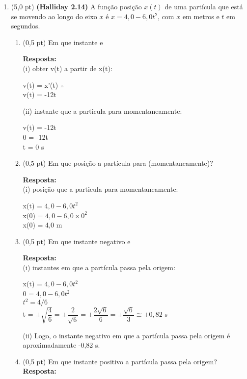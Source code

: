 \documentclass[12pt,a4paper,oneside]{article}
\begin{document}
\begin{enumerate}
	\item (5,0 pt) {\bf (Halliday 2.14)} A função posição $x(t)$ de uma partícula que está se movendo ao longo do eixo $x$ é $x = 4,0 - 6,0t^2$, com $x$ em metros e $t$ em segundos. \label{q:2-14}
	\begin{enumerate}
		\item (0,5 pt) Em que instante e\\
		{ \color{blue}
			{\bf Resposta:} \\
			(i) obter v(t) a partir de x(t):
			\begin{center}
				v(t) = x'(t) $\therefore$\\
				v(t) = -12t
			\end{center}
			(ii) instante que a particula para momentaneamente:
			\begin{center}
				v(t) = -12t \\
				0 = -12t \\
				t = 0 s
			\end{center}			
		}
		\item (0,5 pt) Em que posição a partícula para (momentaneamente)?\\
		{ \color{blue}
			{\bf Resposta:} \\
			(i) posição que a particula para momentaneamente:
			\begin{center}
				x(t) = $4,0 - 6,0t^2$ \\
				x(0) = $4,0 - 6,0 \times 0^2$ \\
				x(0) = 4,0 m
			\end{center}			
		}
		\item (0,5 pt) Em que instante negativo e\\
		{ \color{blue}
			{\bf Resposta:} \\
			(i) instantes em que a partícula passa pela origem:
			\begin{center}
				x(t) = $4,0 - 6,0t^2$ \\
				0 = $4,0 - 6,0t^2$ \\
				$t^2 = 4/6$ \\
				t = $\pm \sqrt{\dfrac{4}{6}} = \pm \dfrac{2}{\sqrt{6}} = \pm \dfrac{2\sqrt{6}}{6} = \pm \dfrac{\sqrt{6}}{3} \cong \pm 0,82$ s
			\end{center}
			(ii) Logo, o instante negativo em que a partícula passa pela origem é aproximadamente -0,82 s.		
		}
		\item (0,5 pt) Em que instante positivo a partícula passa pela origem?\\
		{ \color{blue}
			{\bf Resposta:} \\
}
\end{enumerate}
\end{enumerate}
\end{document}
